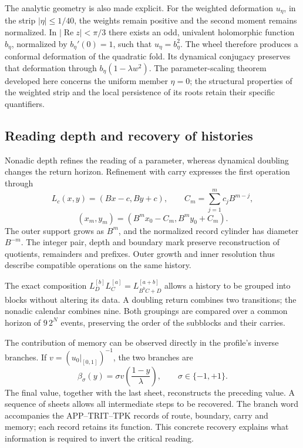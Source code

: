 The analytic geometry is also made explicit. For the weighted
deformation \(u_\eta\), in the strip \(|\eta|\le1/40\), the weights remain
positive and the second moment remains normalized. In
\(|\operatorname{Re}z|<\pi/3\) there exists an odd, univalent holomorphic function
\(b_\eta\), normalized by \(b_\eta'(0)=1\), such that
\(u_\eta=b_\eta^2\). The wheel therefore produces a conformal deformation
of the quadratic fold. Its dynamical conjugacy preserves that deformation
through \(b_\eta(1-\lambda w^2)\). The parameter-scaling theorem
developed here concerns the uniform member \(\eta=0\); the
structural properties of the weighted strip and the local persistence of
its roots retain their specific quantifiers.

\subsection{Reading depth and recovery of histories}

Nonadic depth refines the reading of a parameter, whereas dynamical
doubling changes the return horizon. Refinement with
carry expresses the first operation through
\[
L_c(x,y)=(Bx-c,By+c),\qquad
C_m=\sum_{j=1}^m c_jB^{m-j},
\]
\[
(x_m,y_m)=(B^mx_0-C_m,B^my_0+C_m).
\]
The outer support grows as \(B^m\), and the normalized record cylinder
has diameter \(B^{-m}\). The integer pair, depth and boundary
mark preserve reconstruction of quotients, remainders and prefixes.
Outer growth and inner resolution thus describe compatible
operations on the same history.

The exact composition
\(L_D^{[b]}L_C^{[a]}=L_{B^bC+D}^{[a+b]}\) allows a history to be grouped into
blocks without altering its data. A doubling return combines two
transitions; the nonadic calendar combines nine. Both groupings are
compared over a common horizon of \(9\,2^N\) events, preserving
the order of the subblocks and their carries.

The contribution of memory can be observed directly in the profile’s
inverse branches. If \(v=(u_0|_{[0,1]})^{-1}\), the two branches are
\[
\beta_\sigma(y)=\sigma v\!\left(\frac{1-y}{\lambda}\right),
\qquad \sigma\in\{-1,+1\}.
\]
The final value, together with the last sheet, reconstructs the preceding value. A
sequence of sheets allows all intermediate steps to be recovered. The branch
word accompanies the APP--TRIT--TPK records of route, boundary, carry and
memory; each record retains its function. This concrete recovery
explains what information is required to invert the critical reading.

